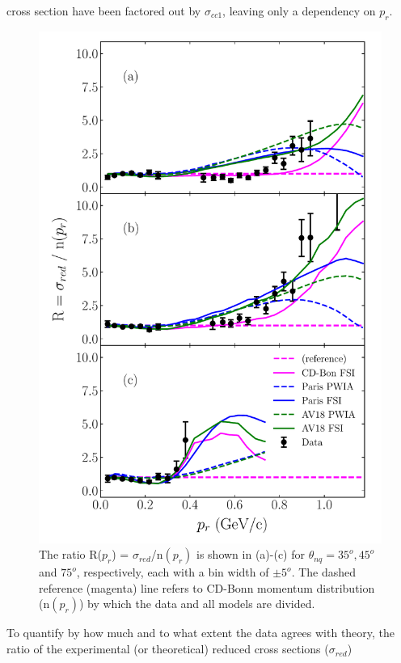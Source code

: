cross section have been factored out by $\sigma_{cc1}$, leaving only a dependency on $p_{r}$. \\
\begin{figure}
\includegraphics[scale=0.5]{prl_plots/PRL_plot2.pdf}
\caption{The ratio R($p_{r}$) = $\sigma_{red}$/n$(p_{r})$ is shown in (a)-(c) for $\theta_{nq}=35^{o}, 45^{o}$ and $75^{o}$, respectively, each with a bin width of $\pm 5^{o}$.
                              The dashed reference (magenta) line refers to CD-Bonn momentum distribution (n$(p_{r})$) by which the data and all models are divided. }
\label{fig:fig1}
\end{figure}
\indent To quantify by how much and to what extent the data agrees with theory, the ratio of the experimental (or theoretical) reduced cross sections ($\sigma_{red}$)
